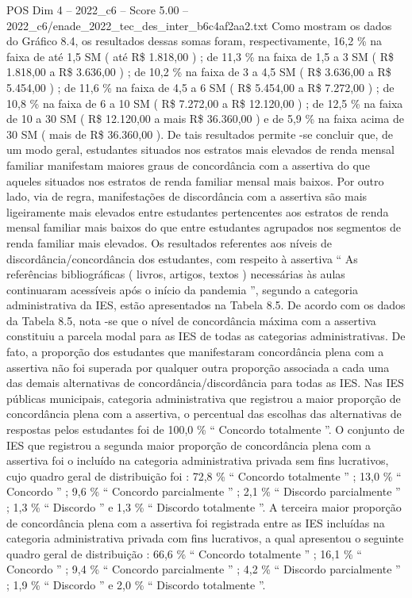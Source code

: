 \begin{textsample}{POS Dim 4 – 2022\_c6 – Score 5.00 – 2022\_c6/enade\_2022\_tec\_des\_inter\_b6c4af2aa2.txt}
Como mostram os dados do Gráfico 8.4, os resultados dessas somas foram, respectivamente, 16,2 \% na faixa de até 1,5 SM ( até R\$ 1.818,00 ) ; de 11,3 \% na faixa de 1,5 a 3 SM ( R\$ 1.818,00 a R\$ 3.636,00 ) ; de 10,2 \% na faixa de 3 a 4,5 SM ( R\$ 3.636,00 a R\$ 5.454,00 ) ; de 11,6 \% na faixa de 4,5 a 6 SM ( R\$ 5.454,00 a R\$ 7.272,00 ) ; de 10,8 \% na faixa de 6 a 10 SM ( R\$ 7.272,00 a R\$ 12.120,00 ) ; de 12,5 \% na faixa de 10 a 30 SM ( R\$ 12.120,00 a mais R\$ 36.360,00 ) e de 5,9 \% na faixa acima de 30 SM ( mais de R\$ 36.360,00 ).
De tais resultados permite -se concluir que, de um modo geral, estudantes situados nos estratos mais elevados de renda mensal familiar manifestam maiores graus de concordância com a assertiva do que aqueles situados nos estratos de renda familiar mensal mais baixos.
Por outro lado, via de regra, manifestações de discordância com a assertiva são mais ligeiramente mais elevados entre estudantes pertencentes aos estratos de renda mensal familiar mais baixos do que entre estudantes agrupados nos segmentos de renda familiar mais elevados.
Os resultados referentes aos níveis de discordância/concordância dos estudantes, com respeito à assertiva “ As referências bibliográficas ( livros, artigos, textos ) necessárias às aulas continuaram acessíveis após o início da pandemia ”, segundo a categoria administrativa da IES, estão apresentados na Tabela 8.5.
De acordo com os dados da Tabela 8.5, nota -se que o nível de concordância máxima com a assertiva constituiu a parcela modal para as IES de todas as categorias administrativas.
De fato, a proporção dos estudantes que manifestaram concordância plena com a assertiva não foi superada por qualquer outra proporção associada a cada uma das demais alternativas de concordância/discordância para todas as IES.
Nas IES públicas municipais, categoria administrativa que registrou a maior proporção de concordância plena com a assertiva, o percentual das escolhas das alternativas de respostas pelos estudantes foi de 100,0 \% “ Concordo totalmente ”.
O conjunto de IES que registrou a segunda maior proporção de concordância plena com a assertiva foi o incluído na categoria administrativa privada sem fins lucrativos, cujo quadro geral de distribuição foi : 72,8 \% “ Concordo totalmente ” ; 13,0 \% “ Concordo ” ; 9,6 \% “ Concordo parcialmente ” ; 2,1 \% “ Discordo parcialmente ” ; 1,3 \% “ Discordo ” e 1,3 \% “ Discordo totalmente ”.
A terceira maior proporção de concordância plena com a assertiva foi registrada entre as IES incluídas na categoria administrativa privada com fins lucrativos, a qual apresentou o seguinte quadro geral de distribuição : 66,6 \% “ Concordo totalmente ” ; 16,1 \% “ Concordo ” ; 9,4 \% “ Concordo parcialmente ” ; 4,2 \% “ Discordo parcialmente ” ; 1,9 \% “ Discordo ” e 2,0 \% “ Discordo totalmente ”.

\end{textsample}
